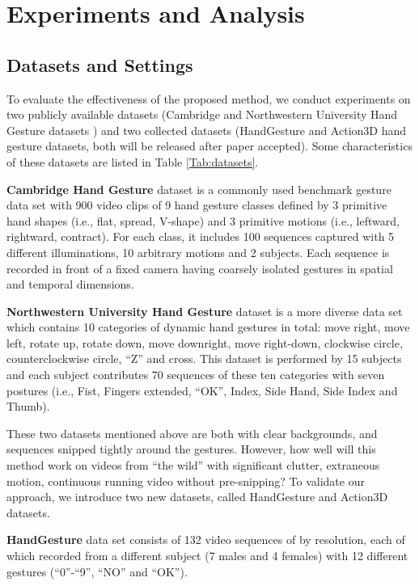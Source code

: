 \documentclass[5p]{elsarticle}
\begin{document}
\section{Experiments and Analysis}
\label{sec:exper}

\subsection{Datasets and Settings}
To evaluate the effectiveness of the proposed method, we conduct experiments on two publicly available datasets (Cambridge \cite{kim2007tensor} and Northwestern University Hand Gesture datasets \cite{shen2012dynamic}) and two collected datasets (HandGesture and Action3D hand gesture datasets, both will be released after paper accepted).
Some characteristics of these datasets are listed in Table \ref{Tab:datasets}.

\textbf{Cambridge Hand Gesture} dataset is a commonly used benchmark gesture data set with 900 video clips of 9 hand gesture classes defined by 3 primitive hand shapes (i.e., flat, spread, V-shape) and 3 primitive motions (i.e., leftward, rightward, contract).
For each class, it includes 100 sequences captured with 5 different illuminations, 10 arbitrary motions and 2 subjects.
Each sequence is recorded in front of a fixed camera having coarsely isolated gestures in spatial and temporal dimensions.

\textbf{Northwestern University Hand Gesture} dataset is a more diverse data set which contains 10 categories of dynamic hand gestures in total: move right, move left, rotate up, rotate down, move downright, move right-down, clockwise circle, counterclockwise circle, ``Z'' and cross.
This dataset is performed by 15 subjects and each subject contributes 70 sequences of these ten categories with seven postures (i.e., Fist, Fingers extended, ``OK'', Index, Side Hand, Side Index and Thumb).

These two datasets mentioned above are both with clear backgrounds, and sequences snipped tightly around the gestures.
However, how well will this method work on videos from ``the wild'' with significant clutter, extraneous motion, continuous running video without pre-snipping?
To validate our approach, we introduce two new datasets, called HandGesture and Action3D datasets.

\textbf{HandGesture} data set consists of 132 video sequences of  by  resolution, each of which recorded from a different subject (7 males and 4 females) with 12 different gestures (``0''-``9'', ``NO'' and ``OK'').
\end{document}
